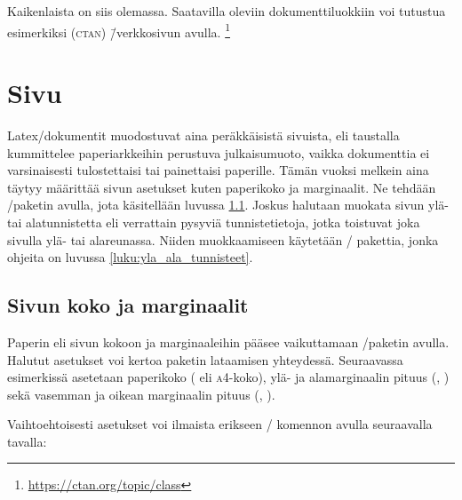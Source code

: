 Kaikenlaista on siis olemassa. Saatavilla oleviin dokumenttiluokkiin voi
tutustua esimerkiksi 
(\textsc{ctan}) \=/verkkosivun avulla.%
\footnote{\url{https://ctan.org/topic/class}}

\section{Sivu}
\label{luku:sivuasetukset}

Latex\-/dokumentit muodostuvat aina peräkkäisistä sivuista, eli
taustalla kummittelee paperiarkkeihin perustuva julkaisumuoto, vaikka
dokumenttia ei varsinaisesti tulostettaisi tai painettaisi paperille.
Tämän vuoksi melkein aina täytyy määrittää sivun asetukset kuten
paperikoko ja marginaalit. Ne tehdään \-/paketin
avulla, jota käsitellään luvussa \ref{luku:sivun_mitat}. Joskus halutaan
muokata sivun ylä- tai alatunnistetta eli verrattain pysyviä
tunnistetietoja, jotka toistuvat joka sivulla ylä- tai alareunassa.
Niiden muokkaamiseen käytetään \-/ pakettia, jonka
ohjeita on luvussa \ref{luku:yla_ala_tunnisteet}.

\subsection{Sivun koko ja marginaalit}
\label{luku:sivun_mitat}

Paperin eli sivun kokoon ja marginaaleihin pääsee vaikuttamaan
\-/paketin avulla. Halutut asetukset
voi kertoa paketin lataamisen yhteydessä. Seuraavassa esimerkissä
asetetaan paperikoko ( eli \textsc{a4}-koko), ylä- ja
alamarginaalin pituus (, ) sekä vasemman ja
oikean marginaalin pituus (, ).

\begin{koodilohkosis}
  \usepackage[a4paper, top=20mm, bottom=30mm,
    left=20mm, right=20mm]{geometry}
\end{koodilohkosis}

Vaihtoehtoisesti asetukset voi ilmaista erikseen \-/
komennon avulla seuraavalla tavalla:

\begin{koodilohkosis}
  \usepackage{geometry}
  \geometry{a4paper, top=20mm, bottom=30mm, left=20mm, right=20mm}
\end{koodilohkosis}

